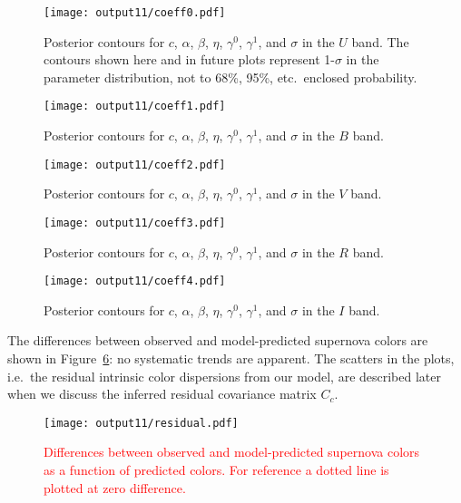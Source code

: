 \documentclass{aastex61}   	%
\begin{document}
\begin{figure}[htbp] %
   \centering
   \texttt{[image: output11/coeff0.pdf]} 
            \caption{Posterior contours for $c$, $\alpha$, $\beta$, $\eta$, $\gamma^0$, $\gamma^1$, and $\sigma$ in the $U$ band.
            The contours shown here and in future plots represent 1-$\sigma$ in the parameter distribution, not to 68\%, 95\%, etc.\
            enclosed probability.  \label{global1:fig}}
\end{figure}

\begin{figure}[htbp] %
   \centering
   \texttt{[image: output11/coeff1.pdf]} 
            \caption{Posterior contours for $c$, $\alpha$, $\beta$, $\eta$, $\gamma^0$, $\gamma^1$, and $\sigma$ in the $B$ band.
 \label{global2:fig}}
\end{figure}

\begin{figure}[htbp] %
   \centering
   \texttt{[image: output11/coeff2.pdf]} 
            \caption{Posterior contours for $c$, $\alpha$, $\beta$, $\eta$, $\gamma^0$, $\gamma^1$, and $\sigma$ in the $V$ band.
 \label{global3:fig}}
\end{figure}

\begin{figure}[htbp] %
   \centering
      \texttt{[image: output11/coeff3.pdf]} 
            \caption{Posterior contours for $c$, $\alpha$, $\beta$, $\eta$, $\gamma^0$, $\gamma^1$, and $\sigma$ in the $R$ band.
 \label{global4:fig}}
\end{figure}

\begin{figure}[htbp] %
   \centering
         \texttt{[image: output11/coeff4.pdf]} 
            \caption{Posterior contours for $c$, $\alpha$, $\beta$, $\eta$, $\gamma^0$, $\gamma^1$, and $\sigma$ in the $I$ band.
 \label{global5:fig}}
\end{figure}

\color{red}

The differences between observed and model-predicted supernova colors are shown in Figure~\ref{residual:fig}:
no systematic trends are apparent.
The scatters in the plots, i.e.\ the residual intrinsic color dispersions from our model, are described
later when we discuss the inferred residual covariance matrix $C_c$.
\begin{figure}[htbp] %
   \centering
   \texttt{[image: output11/residual.pdf]} 
            \caption{\textcolor{red}{Differences between observed and  model-predicted supernova colors  as a function
            of predicted colors.  For reference a dotted line is plotted at zero difference.}
            \label{residual:fig}}
\end{figure}
\end{document}
